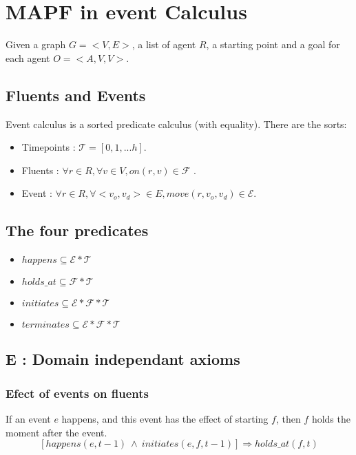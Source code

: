 \section{MAPF in event Calculus}\label{sec:introduction}

Given a graph $G = <V,E>$, a list of agent $R$, a starting point and a goal for each agent $O = <A,V,V>$.

\subsection{Fluents and Events}

Event calculus is a sorted predicate calculus (with equality). There are the sorts:

\begin{itemize}
  \item Timepoints : $\mathcal{T} = [0, 1, ... h]$.
  \item Fluents : $\forall r \in R, \forall v \in V, on(r,v) \in \mathcal{F}$ .
  \item Event : $\forall r \in R, \forall <v_o,v_d> \in E, move(r,v_o,v_d) \in \mathcal{E}$.
\end{itemize}

\subsection{The four predicates}

\begin{itemize}
  \item $happens \subseteq \mathcal{E}*\mathcal{T}$
  \item $holds\_at \subseteq \mathcal{F}*\mathcal{T}$
  \item $initiates \subseteq \mathcal{E}*\mathcal{F}*\mathcal{T}$
  \item $terminates \subseteq \mathcal{E}*\mathcal{F}*\mathcal{T}$
\end{itemize}

\subsection{E : Domain independant axioms}

\subsubsection{Efect of events on fluents}

If an event $e$ happens, and this event has the effect of starting $f$, then $f$ holds the moment after the event.
\begin{equation}
  \tag{E.1}
  [happens(e,t-1)\ \land\ initiates(e,f,t-1)] \Rightarrow holds\_at(f,t)
\end{equation}

